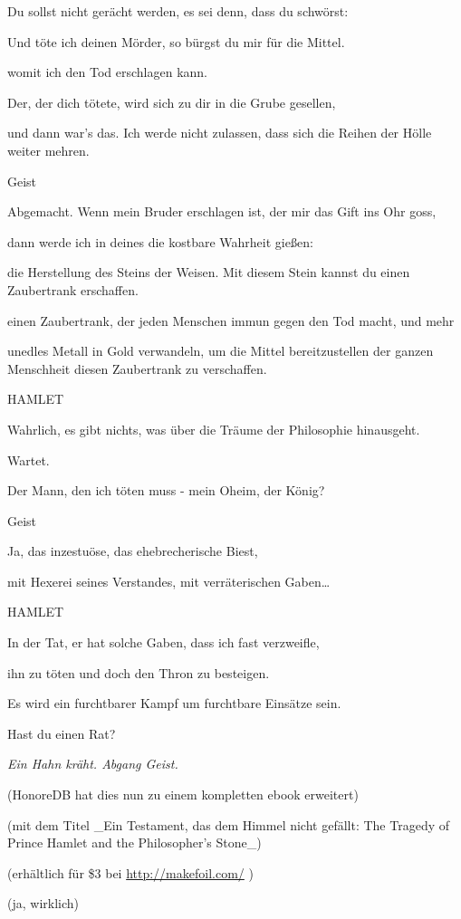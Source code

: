 {Du sollst nicht gerächt werden, es sei denn, dass du schwörst:

Und töte ich deinen Mörder, so bürgst du mir für die Mittel.

womit ich den Tod erschlagen kann.

Der, der dich tötete, wird sich zu dir in die Grube gesellen,

und dann war's das. Ich werde nicht zulassen, dass sich die Reihen der Hölle weiter mehren.

Geist

Abgemacht. Wenn mein Bruder erschlagen ist, der mir das Gift ins Ohr goss,

dann werde ich in deines die kostbare Wahrheit gießen:

die Herstellung des Steins der Weisen. Mit diesem Stein kannst du einen Zaubertrank erschaffen.

einen Zaubertrank, der jeden Menschen immun gegen den Tod macht, und mehr

unedles Metall in Gold verwandeln, um die Mittel bereitzustellen der ganzen Menschheit diesen Zaubertrank zu verschaffen.

HAMLET

Wahrlich, es gibt nichts, was über die Träume der Philosophie hinausgeht.

Wartet.

Der Mann, den ich töten muss - mein Oheim, der König?

Geist

Ja, das inzestuöse, das ehebrecherische Biest,

mit Hexerei seines Verstandes, mit verräterischen Gaben…

HAMLET

In der Tat, er hat solche Gaben, dass ich fast verzweifle,

ihn zu töten und doch den Thron zu besteigen.

Es wird ein furchtbarer Kampf um furchtbare Einsätze sein.

Hast du einen Rat?

\emph{\emph{Ein Hahn kräht. Abgang Geist.}}

(HonoreDB hat dies nun zu einem kompletten ebook erweitert)

(mit dem Titel \_Ein Testament, das dem Himmel nicht gefällt: The Tragedy of Prince Hamlet and the Philosopher's Stone\_)

(erhältlich für \$3 bei \url{http://makefoil.com/} )

(ja, wirklich)

}
